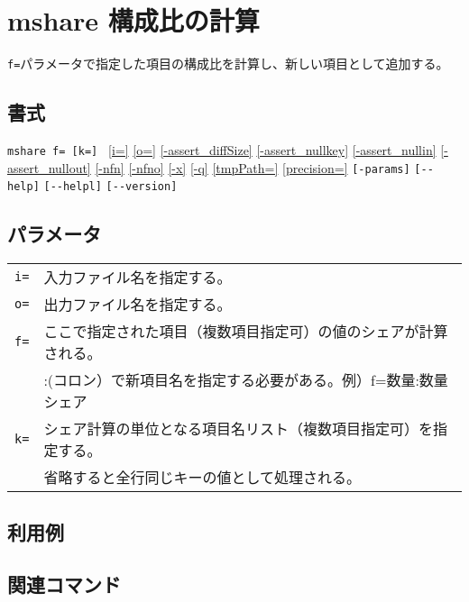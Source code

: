 
%

\section{mshare 構成比の計算\label{sect:mshare}}
\verb|f=|パラメータで指定した項目の構成比を計算し、新しい項目として追加する。\\

\subsection*{書式}
\verb|mshare f= [k=] |
\hyperref[sect:option_i]{[i=]}
\hyperref[sect:option_o]{[o=]}
\hyperref[sect:option_assert_diffSize]{[-assert\_diffSize]}
\hyperref[sect:option_assert_nullkey]{[-assert\_nullkey]}
\hyperref[sect:option_assert_nullin]{[-assert\_nullin]}
\hyperref[sect:option_assert_nullout]{[-assert\_nullout]}
\hyperref[sect:option_nfn]{[-nfn]} 
\hyperref[sect:option_nfno]{[-nfno]}  
\hyperref[sect:option_x]{[-x]}
\hyperref[sect:option_x]{[-q]}
\hyperref[sect:option_option_tmppath]{[tmpPath=]}
\hyperref[sect:option_precision]{[precision=]}
\verb|[-params]|
\verb|[--help]|
\verb|[--helpl]|
\verb|[--version]|\\

\subsection*{パラメータ}
\begin{table}[htbp]
{\small
\begin{tabular}{ll}
\verb|i=|    & 入力ファイル名を指定する。\\
\verb|o=|    & 出力ファイル名を指定する。\\ 
\verb|f=|    & ここで指定された項目（複数項目指定可）の値のシェアが計算される。 \\
             & :(コロン）で新項目名を指定する必要がある。例）f=数量:数量シェア\\
\verb|k=|    & シェア計算の単位となる項目名リスト（複数項目指定可）を指定する。\\
             & 省略すると全行同じキーの値として処理される。\\
\end{tabular} 
}
\end{table} 

\subsection*{利用例}

\subsection*{関連コマンド}

%
